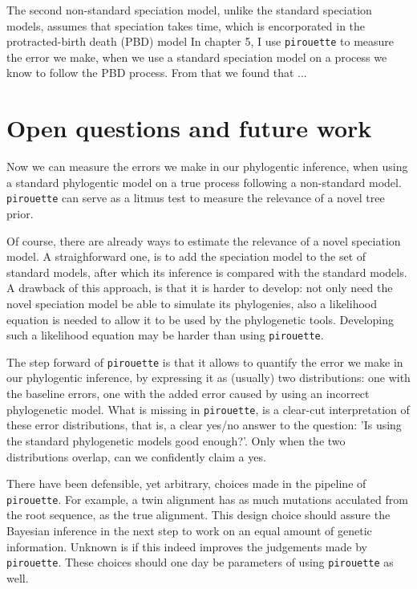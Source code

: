 The second non-standard speciation model,
unlike the standard speciation models,
assumes that speciation takes time,
which is encorporated in the protracted-birth death (PBD) model
In chapter 5, I 
use \verb;pirouette; to 
measure the error we make, when we use a standard speciation
model on a process we know to follow the PBD process.
From that we found that ...

\section{Open questions and future work}

Now we can measure the errors we make in our phylogentic
inference, when using a standard phylogentic model on a
true process following a non-standard model. 
\verb;pirouette; can serve as a litmus test 
to measure the relevance of a novel tree prior. 

Of course, there are already ways to estimate the relevance of a
novel speciation model. A straighforward one, is to add the speciation
model to the set of standard models, after which its inference is
compared with the standard models. A drawback of this approach, is
that it is harder to develop: not only need the novel speciation model
be able to simulate its phylogenies, also a likelihood equation is needed
to allow it to be used by the phylogenetic tools. Developing such a
likelihood equation may be harder than using \verb;pirouette;.

The step forward of \verb;pirouette; is that it allows 
to quantify the error we make in our phylogentic inference, by
expressing it as (usually) two distributions: one with the baseline errors,
one with the added error caused by using an incorrect phylogenetic model.
What is missing in \verb;pirouette;, is a clear-cut interpretation of these 
error distributions, that is, a clear yes/no answer to the question: 'Is
using the standard phylogenetic models good enough?'. Only when the two
distributions overlap, can we confidently claim a yes. 

There have been defensible, yet arbitrary, choices made in the pipeline
of \verb;pirouette;. For example, a twin alignment has as much
mutations acculated from the root sequence, as the true alignment. 
This design choice should assure the Bayesian inference in the next step
to work on an equal amount of genetic information. Unknown is if this
indeed improves the judgements made by \verb;pirouette;. These choices
should one day be parameters of using \verb;pirouette; as well.

